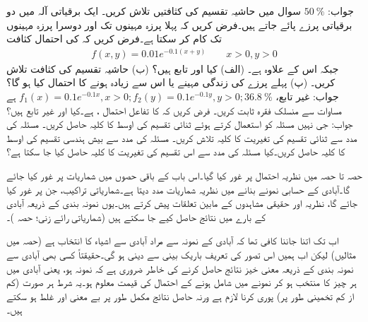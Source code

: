 جواب:\quad
$\SI{50}{\percent}$
\quad
سوال  میں حاشیہ تقسیم کی کثافتیں تلاش کریں۔
\quad
ایک برقیاتی آلہ میں دو برقیاتی پرزے پائے جاتے ہیں۔فرض کریں کہ پہلا پرزہ  مہینوں تک اور دوسرا پرزہ  مہینوں تک کام کر سکتا ہے۔فرض کریں کہ  کی احتمال کثافت
\begin{align*}
f(x,y)=0.01e^{-0.1(x+y)}\quad\quad x>0,y>0
\end{align*}
جبکہ اس کے علاوہ  ہے۔ (الف) کیا  اور  تابع ہیں؟ (ب) حاشیہ تقسیم کی کثافت تلاش کریں۔ (پ) پہلے پرزے کی زندگی  مہینے یا اس سے زیادہ ہونے کا احتمال کیا ہو گا؟\\
جواب:\quad
غیر تابع،  
$f_1(x)=0.1e^{-0.1x}, x>0; f_2(y)=0.1e^{-0.1y}, y>0; \SI{36.8}{\percent}$
ہے
\quad
مساوات  سے منسلک فقرہ ثابت کریں۔
\quad
فرض کریں کہ  کا تفاعل احتمال ،  ہے۔کیا  اور  غیر تابع ہیں؟\\
جواب: جی نہیں
\quad
مسئلہ  کو استعمال کرتے ہوئے ثنائی تقسیم کی اوسط  کا کلیہ  حاصل کریں۔
\quad
مسئلہ  کی مدد سے ثنائی تقسیم کی تغیریت  کا کلیہ تلاش کریں۔
\quad
مسئلہ   کی مدد سے  بیش ہندسی تقسیم کی اوسط کا کلیہ  حاصل کریں۔کیا  مسئلہ  کی مدد سے اس تقسیم کی تغیریت کا کلیہ حاصل کیا جا سکتا ہے؟

حصہ  تا حصہ  میں نظریہ احتمال پر غور کیا گیا۔اس باب کے باقی حصوں میں شماریات پر غور کیا جائے گا۔آبادی کے حسابی نمونے بنانے میں نظریہ شماریات مدد دیتا ہے۔شماریاتی تراکیب، جن پر غور کیا جائے گا،  نظریہ اور  حقیقی مشاہدوں  کے مابین تعلقات پیش کرتے ہیں۔یوں نمونہ بندی کے ذریعہ آبادی کے بارے میں نتائج حاصل کیے جا سکتے ہیں (شماریاتی رائے زنی؛ حصہ )۔

اب تک اتنا جاننا کافی تھا کہ آبادی کے نمونہ سے مراد آبادی سے اشیاء کا انتخاب ہے (حصہ  میں مثالیں) لیکن اب ہمیں اس تصور کی تعریف باریک بینی سے دینی ہو گی۔حقیقتاً کسی بھی آبادی سے نمونہ بندی کے ذریعہ معنی خیز نتائج حاصل کرنے کی خاطر ضروری ہے کہ نمونہ  ہو، یعنی آبادی میں ہر چیز کا  منتخب ہو کر نمونے میں شامل ہونے  کے احتمال کی قیمت معلوم ہو۔یہ شرط ہر صورت (کم از کم تخمینی طور پر) پوری کرنا لازم ہے ورنہ حاصل نتائج مکمل طور پر بے معنی اور غلط ہو سکتے ہیں۔

